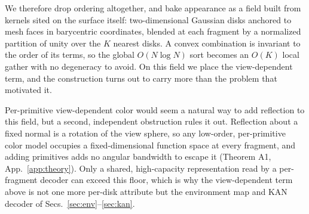 %
%
%
%

We therefore drop ordering altogether, and bake appearance as a field built from kernels sited on
the surface itself: two-dimensional Gaussian disks anchored to mesh faces in barycentric
coordinates, blended at each fragment by a normalized partition of unity over the $K$ nearest
disks. A convex combination is invariant to the order of its terms, so the global $O(N\log N)$ sort
becomes an $O(K)$ local gather with no degeneracy to avoid. On this field we place the
view-dependent term, and the construction turns out to carry more than the problem that motivated
it.

Per-primitive view-dependent color would seem a natural way to add reflection to this field, but a
second, independent obstruction rules it out. Reflection about a fixed normal is a rotation of the
view sphere, so any low-order, per-primitive color model occupies a fixed-dimensional function
space at every fragment, and adding primitives adds no angular bandwidth to escape it (Theorem A1,
App.~\ref{app:theory}). Only a shared, high-capacity representation read by a per-fragment decoder
can exceed this floor, which is why the view-dependent term above is not one more per-disk
attribute but the environment map and KAN decoder of Secs.~\ref{sec:env}--\ref{sec:kan}.


